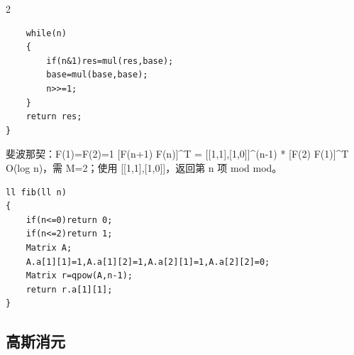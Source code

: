 \documentclass[UTF8,fontset=fandol,a4paper,twoside]{ctexart}
\newcommand{\note}[1]{{\fontsize{10}{12}\selectfont #1\par}}
\begin{document}
\begin{multicols}{2}
\begin{lstlisting}
    while(n)
    {
        if(n&1)res=mul(res,base);
        base=mul(base,base);
        n>>=1;
    }
    return res;
}
\end{lstlisting}
\note{斐波那契：F(\allowbreak{}1)\allowbreak{}=\allowbreak{}F(\allowbreak{}2)\allowbreak{}=\allowbreak{}1 [\allowbreak{}F(\allowbreak{}n+\allowbreak{}1)\allowbreak{} F(\allowbreak{}n)\allowbreak{}]\allowbreak{}\textasciicircum{}T =\allowbreak{} [\allowbreak{}[\allowbreak{}1,\allowbreak{}1]\allowbreak{},\allowbreak{}[\allowbreak{}1,\allowbreak{}0]\allowbreak{}]\allowbreak{}\textasciicircum{}(\allowbreak{}n-\allowbreak{}1)\allowbreak{} * [\allowbreak{}F(\allowbreak{}2)\allowbreak{} F(\allowbreak{}1)\allowbreak{}]\allowbreak{}\textasciicircum{}T O(\allowbreak{}log n)\allowbreak{}，需 M=\allowbreak{}2；使用 [\allowbreak{}[\allowbreak{}1,\allowbreak{}1]\allowbreak{},\allowbreak{}[\allowbreak{}1,\allowbreak{}0]\allowbreak{}]\allowbreak{}，返回第 n 项 mod mod。}
\begin{lstlisting}
ll fib(ll n)
{
    if(n<=0)return 0;
    if(n<=2)return 1;
    Matrix A;
    A.a[1][1]=1,A.a[1][2]=1,A.a[2][1]=1,A.a[2][2]=0;
    Matrix r=qpow(A,n-1);
    return r.a[1][1];
}
\end{lstlisting}
\subsection{高斯消元}


\end{multicols}
\end{document}
